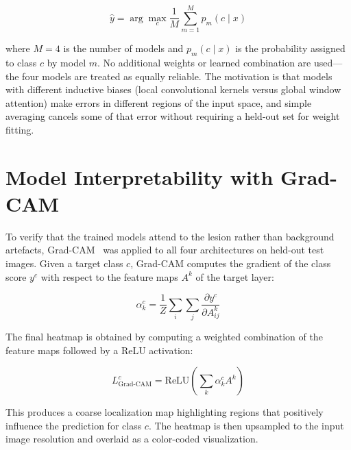 \begin{equation}
\hat{y} = \arg\max_c \frac{1}{M} \sum_{m=1}^{M} p_m(c \mid x)
\label{eq:ensemble}
\end{equation}

where $M=4$ is the number of models and $p_m(c \mid x)$ is the probability assigned to class $c$ by model $m$. No additional weights or learned combination are used---the four models are treated as equally reliable. The motivation is that models with different inductive biases (local convolutional kernels versus global window attention) make errors in different regions of the input space, and simple averaging cancels some of that error without requiring a held-out set for weight fitting.

\section{Model Interpretability with Grad-CAM}

To verify that the trained models attend to the lesion rather than background artefacts, Grad-CAM~\cite{selvaraju2017grad} was applied to all four architectures on held-out test images. Given a target class $c$, Grad-CAM computes the gradient of the class score $y^c$ with respect to the feature maps $A^k$ of the target layer:

\begin{equation}
\alpha_k^c = \frac{1}{Z} \sum_i \sum_j \frac{\partial y^c}{\partial A_{ij}^k}
\label{eq:gradcam_weights}
\end{equation}

The final heatmap is obtained by computing a weighted combination of the feature maps followed by a ReLU activation:

\begin{equation}
L_{\text{Grad-CAM}}^c = \text{ReLU}\left(\sum_k \alpha_k^c A^k\right)
\label{eq:gradcam}
\end{equation}

This produces a coarse localization map highlighting regions that positively influence the prediction for class $c$. The heatmap is then upsampled to the input image resolution and overlaid as a color-coded visualization.
